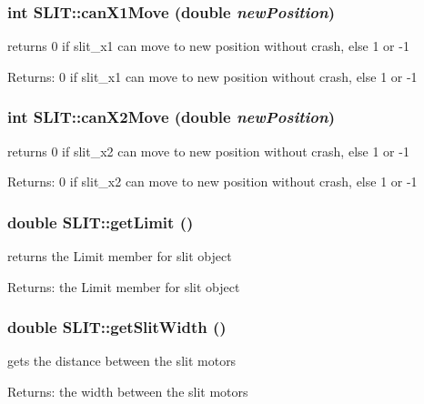 \subsubsection{\setlength{\rightskip}{0pt plus 5cm}int SLIT::can\-X1Move (double {\em new\-Position})}\label{classSLIT_ff3c5b32c92f6fa9f5eafe67f74173c1}


returns 0 if slit\_\-x1 can move to new position without crash, else 1 or -1 \begin{Desc}
\item[Returns:]0 if slit\_\-x1 can move to new position without crash, else 1 or -1 \end{Desc}
\subsubsection{\setlength{\rightskip}{0pt plus 5cm}int SLIT::can\-X2Move (double {\em new\-Position})}\label{classSLIT_44e0b9c5bef453856da21df389c4d7b1}


returns 0 if slit\_\-x2 can move to new position without crash, else 1 or -1 \begin{Desc}
\item[Returns:]0 if slit\_\-x2 can move to new position without crash, else 1 or -1 \end{Desc}
\subsubsection{\setlength{\rightskip}{0pt plus 5cm}double SLIT::get\-Limit ()}\label{classSLIT_d2a021371c2ab19c84683a6613a60ff4}


returns the Limit member for slit object \begin{Desc}
\item[Returns:]the Limit member for slit object \end{Desc}
\subsubsection{\setlength{\rightskip}{0pt plus 5cm}double SLIT::get\-Slit\-Width ()}\label{classSLIT_a820571f1254ac87a18c6aed03495b4c}


gets the distance between the slit motors \begin{Desc}
\item[Returns:]the width between the slit motors \end{Desc}
